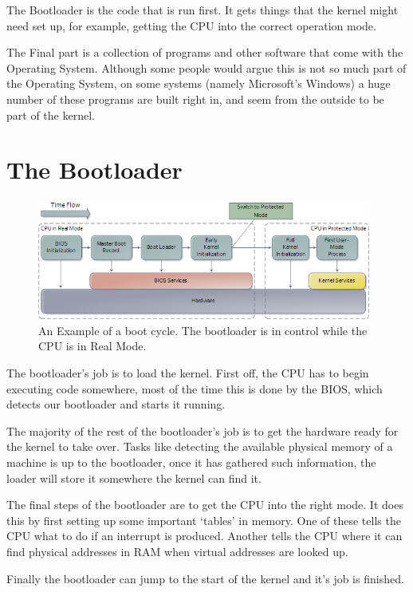 \documentclass[a4paper]{report}
\begin{document}
The Bootloader is the code that is run first. It gets things that the kernel might need set up, for example, getting the CPU into the correct operation mode.

The Final part is a collection of programs and other software that come with the Operating System. Although some people would argue this is not so much part of the Operating System, on some systems (namely Microsoft's Windows) a huge number of these programs are built right in, and seem from the outside to be part of the kernel.

\section{The Bootloader}

\begin{figure}[ht]
\centering
\includegraphics[width=415px]{images/bootProcess.png}
\caption{An Example of a boot cycle. The bootloader is in control while the CPU is in Real Mode.}
\label{fig:theloader}
\end{figure}

The bootloader's job is to load the kernel. First off, the CPU has to begin executing code somewhere, most of the time this is done by the BIOS, which detects our bootloader and starts it running.

The majority of the rest of the bootloader's job is to get the hardware ready for the kernel to take over. Tasks like detecting the available physical memory of a machine is up to the bootloader, once it has gathered such information, the loader will store it somewhere the kernel can find it.

The final steps of the bootloader are to get the CPU into the right mode. It does this by first setting up some important `tables' in memory. One of these tells the CPU what to do if an interrupt is produced. Another tells the CPU where it can find physical addresses in RAM when virtual addresses are looked up.

Finally the bootloader can jump to the start of the kernel and it's job is finished.
\end{document}
